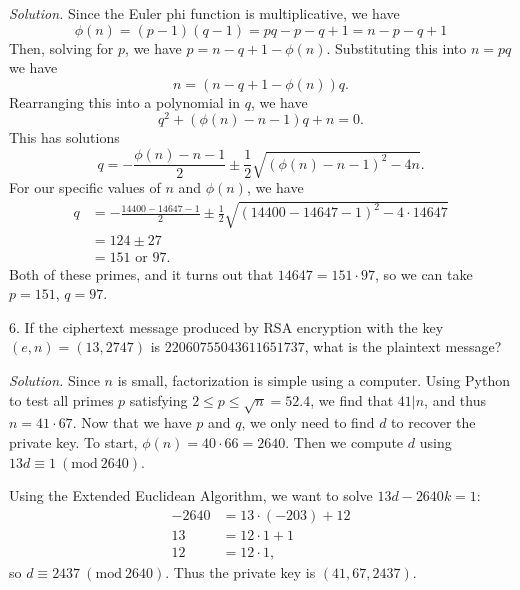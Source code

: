 \documentclass{article}
\newcommand{\Mod}[1]{\ (\mathrm{mod}\ #1)}
\begin{document}
\textit{Solution.}
Since the Euler phi function is multiplicative, we have
%
\begin{equation*}
    \phi(n) = (p - 1) (q - 1) = p q - p - q + 1 = n - p - q + 1
\end{equation*}
%
Then, solving for $p$, we have $p = n - q + 1 - \phi(n)$. Substituting
this into $n = p q$ we have
%
\begin{equation*}
    n = (n - q + 1 - \phi(n)) q
    .
\end{equation*}
%
Rearranging this into a polynomial in $q$, we have
%
\begin{equation*}
    q^2 + (\phi(n) - n - 1) q + n = 0
    .
\end{equation*}
%
This has solutions
%
\begin{equation*}
    q = - \frac{\phi(n) - n - 1}{2} \pm \frac{1}{2} \sqrt{(\phi(n) - n - 1)^2 - 4 n}
    .
\end{equation*}
%
For our specific values of $n$ and $\phi(n)$, we have
%
\begin{align*}
    q &= - \frac{14400 - 14647 - 1}{2} \pm \frac{1}{2} \sqrt{(14400 - 14647 - 1)^2 - 4 \cdot 14647} \\
      &= 124 \pm 27 \\
      &= 151 \text{ or } 97
    .
\end{align*}
%
Both of these primes, and it turns out that $14647 = 151 \cdot 97$, so we can take
$p = 151$, $q = 97$.

\newpage

6. If the ciphertext message produced by RSA encryption with the key
$(e, n) = (13, 2747)$ is $22060755043611651737$, what is the plaintext
message?

\textit{Solution.}
Since $n$ is small, factorization is simple using a computer.
Using Python to test all primes $p$ satisfying
$2 \leq p \leq \sqrt{n} = 52.4$, we find that $41 \vert n$, and thus
$n = 41 \cdot 67$. Now that we have $p$ and $q$, we only need to find
$d$ to recover the private key. To start, $\phi(n) = 40 \cdot 66 = 2640$.
Then we compute $d$ using $13 d \equiv 1 \Mod{2640}$.

Using the Extended Euclidean Algorithm, we want to solve $13d - 2640 k = 1$:
%
\begin{align*}
    -2640 &= 13 \cdot (-203) + 12 \\
    13 &= 12 \cdot 1 + 1\\
    12 &= 12 \cdot 1
    ,
\end{align*}
%
so $d \equiv 2437 \Mod{2640}$. Thus the private key is $(41, 67, 2437)$.
\end{document}
